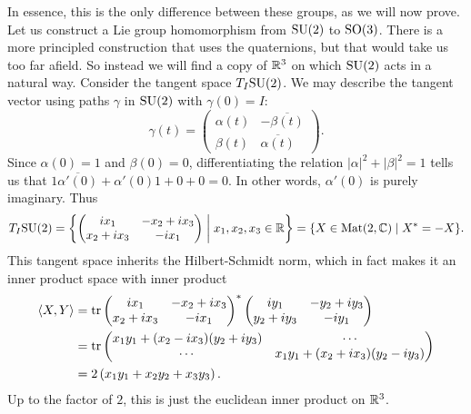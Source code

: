 In essence, this is the only difference between these groups, as we will now prove.
Let us construct a Lie group homomorphism from $\mathrm{SU}(2)$ to $\mathrm{SO}(3)$.
There is a more principled construction that uses the quaternions, but that would take us too far afield. 
So instead we will find a copy of $\mathbb{R}^3$ on which $\mathrm{SU}(2)$ acts in a natural way.
Consider the tangent space $T_I\mathrm{SU}(2)$.
We may describe the tangent vector using paths $\gamma$ in $\mathrm{SU}(2)$ with $\gamma(0) = I$:
\[
\gamma(t) = \begin{pmatrix} \alpha(t) & -\overline{\beta(t)} \\ \beta(t) & \overline{\alpha(t)} \end{pmatrix}.
\]
Since $\alpha(0) = 1$ and $\beta(0) = 0$, differentiating the relation $|\alpha|^2 + |\beta|^2 = 1$ tells us that $1\overline{\alpha'(0)} + \alpha'(0)1 + 0 + 0 = 0$.
In other words, $\alpha'(0)$ is purely imaginary.
Thus
\[
T_I\mathrm{SU}(2) 
= \left\{ \begin{pmatrix} i x_1 & -x_2 + i x_3 \\ x_2 + i x_3 & -ix_1 \end{pmatrix} \;\middle|\; x_1,x_2,x_3 \in \mathbb{R} \right\}
= \{ X \in \operatorname{Mat}(2,\mathbb{C}) \mid X^\ast = - X\}.
\]
This tangent space inherits the Hilbert-Schmidt norm, which in fact makes it an inner product space with inner product
\begin{align*}
\langle X, Y \rangle
&= \operatorname{tr} \begin{pmatrix} i x_1 & -x_2 + i x_3 \\ x_2 + i x_3 & -ix_1 \end{pmatrix}^\ast\begin{pmatrix} i y_1 & -y_2 + i y_3 \\ y_2 + i y_3 & -iy_1 \end{pmatrix} \\
&= \operatorname{tr} \begin{pmatrix}
x_1y_1 + (x_2 - i x_3)(y_2 + i y_3) & \cdots \\
\cdots & x_1y_1 + (x_2 + i x_3)(y_2 - i y_3)
\end{pmatrix} \\
&= 2\left(x_1y_1 + x_2y_2 + x_3y_3\right).
\end{align*}
Up to the factor of $2$, this is just the euclidean inner product on $\mathbb{R}^3$.

